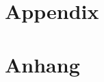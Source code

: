 
{\chapter{Appendix}}    %
{\chapter{Anhang}}      %
\label{chap:appendix}
\setcounter{figure}{0}


\label{label}

